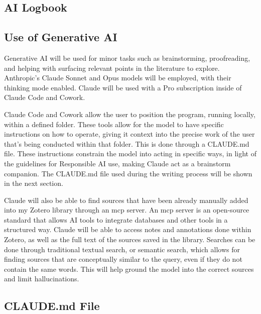 \begin{appendices}
\renewcommand{\thesection}{\Roman{section}}
\renewcommand{\thesubsection}{\thesection.\Alph{subsection}}
\section{AI Logbook}

\subsection{Use of Generative AI}

Generative AI will be used for minor tasks such as brainstorming, proofreading, and helping with surfacing relevant points in the literature to explore. 
Anthropic's Claude Sonnet and Opus models will be employed, with their thinking mode enabled. 
Claude will be used with a Pro subscription inside of Claude Code\autocite{HowClaudeCode} and Cowork.\autocite{GetStartedCowork}

Claude Code and Cowork allow the user to position the program, running locally, within a defined folder.\autocite{HowClaudeCode}
These tools allow for the model to have specific instructions on how to operate, giving it context into the precise work of the user that's being conducted within that folder.\autocite{HowClaudeRemembers}
This is done through a CLAUDE.md file.\autocite{HowClaudeRemembers}
These instructions constrain the model into acting in specific ways, in light of the guidelines for Responsible AI use, making Claude act as a brainstorm companion.
The CLAUDE.md file used during the writing process will be shown in the next section.

Claude will also be able to find sources that have been already manually added into my Zotero library through an \gls{mcp} server.\autocite{yu54yyyuZoteromcp2026}
An \gls{mcp} server is an open-source standard that allows AI tools to integrate databases and other tools in a structured way.\autocite{WhatModelContext}
Claude will be able to access notes and annotations done within Zotero, as well as the full text of the sources saved in the library.
Searches can be done through traditional textual search, or semantic search, which allows for finding sources that are conceptually similar to the query, even if they do not contain the same words.
This will help ground the model into the correct sources and limit hallucinations.

\subsection{CLAUDE.md File}



\end{appendices}
